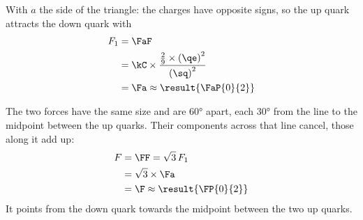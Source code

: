 \begin{abcliste}
\abc With $a$ the side of the triangle: the charges have opposite signs, so the up quark attracts the down quark with
\begin{align}
 F_1 &= \FaF \\
   &= \kC\times\frac{\frac{2}{9}\times\left(\qe\right)^2}{\left(\sq\right)^2} \\
   &= \Fa \approx \result{\FaP{0}{2}}
\end{align}

\abc
\begin{center}
\end{center}
The two forces have the same size and are \ang{60} apart, each \ang{30} from the line to the midpoint between the up quarks. Their components across that line cancel, those along it add up:
\begin{align}
 F &= \FF = \sqrt{3}\,F_1 \\
   &= \sqrt{3}\times\Fa \\
   &= \F \approx \result{\FP{0}{2}}
\end{align}
It points from the down quark towards the midpoint between the two up quarks.
\end{abcliste}
